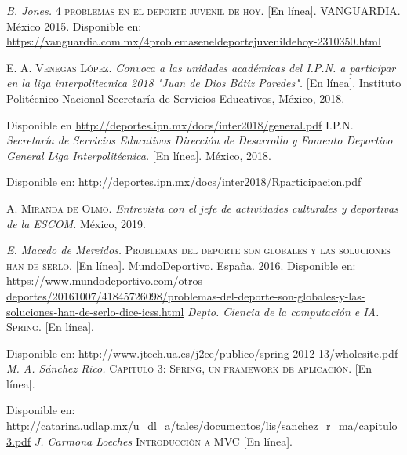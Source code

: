 
\begin{thebibliography}{}
	\textit{B. Jones.}
	\textsc{4 problemas en el deporte juvenil de hoy.} [En línea].
	VANGUARDIA. México 2015.
	\linebreak
	Disponible en: 
	\url{https://vanguardia.com.mx/4problemaseneldeportejuvenildehoy-2310350.html}
	
	\textsc{E. A. Venegas López.}
	\textit{Convoca a las unidades académicas del I.P.N. a participar en la liga interpolitecnica 2018 "Juan de Dios Bátiz Paredes".} [En línea]. Instituto Politécnico Nacional Secretaría de Servicios Educativos, México, 2018.
	
	\linebreak
	Disponible en
	\url{http://deportes.ipn.mx/docs/inter2018/general.pdf}
	\textsc{I.P.N.}
	\textit{Secretaría de Servicios Educativos Dirección de Desarrollo y Fomento Deportivo General Liga Interpolitécnica.}
	[En línea]. México, 2018.
	
	\linebreak
	Disponible en: 
	\url{http://deportes.ipn.mx/docs/inter2018/Rparticipacion.pdf}
	
	\textsc{A. Miranda de Olmo.}
	\textit{Entrevista con el jefe de actividades culturales y deportivas de la ESCOM.} México, 2019.
	
	\linebreak
	\textit{E. Macedo de Mereidos.}
	\textsc{Problemas del deporte son globales y las soluciones han de serlo.} [En línea]. 
	MundoDeportivo. España. 2016.
	\linebreak
	Disponible en: 
	\url{https://www.mundodeportivo.com/otros-deportes/20161007/41845726098/problemas-del-deporte-son-globales-y-las-soluciones-han-de-serlo-dice-icss.html}
	\textit{Depto. Ciencia de la computación e IA.}
	\textsc{Spring.} [En línea]. 
	
	\linebreak
	Disponible en:
	\url{http://www.jtech.ua.es/j2ee/publico/spring-2012-13/wholesite.pdf}
	\textit{M. A. Sánchez Rico.}
	\textsc{Capítulo 3: Spring, un framework de aplicación.} [En línea].
	
	\linebreak
	Disponible en:
	\url{http://catarina.udlap.mx/u_dl_a/tales/documentos/lis/sanchez_r_ma/capitulo3.pdf}
	\textit{J. Carmona Loeches}
	\textsc{Introducción a MVC} [En línea]. 
	

\end{thebibliography}
